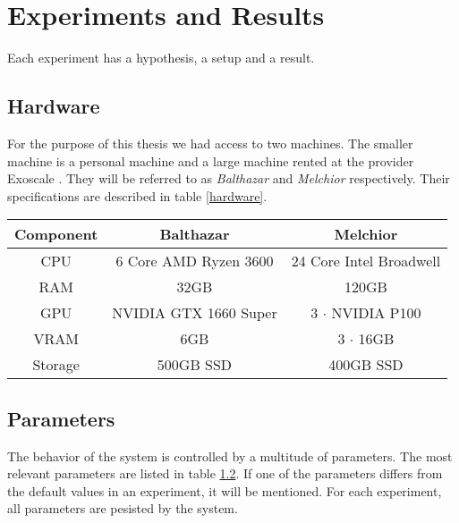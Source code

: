\chapter{Experiments and Results}
\label{experiments-and-results}

Each experiment has a hypothesis, a setup and a result.

\section{Hardware}
For the purpose of this thesis we had access to two machines. The smaller machine is a personal machine and a large machine rented at the provider Exoscale \cite{noauthor_exoscale_nodate}. They will be referred to as \textit{Balthazar} and \textit{Melchior} respectively. Their specifications are described in table \ref{hardware}.

\begin{table*}[!h]
    \begin{center}
        \begin{tabular}{ c|c|c }
            Component & Balthazar             & Melchior                \\
            \hline
            \hline
            CPU       & 6 Core AMD Ryzen 3600 & 24 Core Intel Broadwell \\
            RAM       & 32GB                  & 120GB                   \\
            GPU       & NVIDIA GTX 1660 Super & 3 $\cdot$ NVIDIA P100   \\
            VRAM      & 6GB                   & 3 $\cdot$ 16GB          \\
            Storage   & 500GB SSD             & 400GB SSD               \\
        \end{tabular}
    \end{center}
    \caption{Hardware specifications of the utilized machines}
    \label{hardware}
\end{table*}

\section{Parameters}
\label{parameters}
The behavior of the system is controlled by a multitude of parameters. The most relevant parameters are listed in table \ref{parameters}. If one of the parameters differs from the default values in an experiment, it will be mentioned. For each experiment, all parameters are pesisted by the system.

